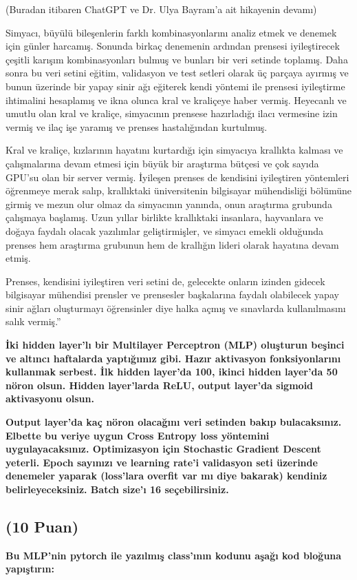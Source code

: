 \documentclass[11pt]{article}
\begin{document}
(Buradan itibaren ChatGPT ve Dr. Ulya Bayram'a ait hikayenin devamı)

Simyacı, büyülü bileşenlerin farklı kombinasyonlarını analiz etmek ve denemek için günler harcamış. Sonunda birkaç denemenin ardından prensesi iyileştirecek çeşitli karışım kombinasyonları bulmuş ve bunları bir veri setinde toplamış. Daha sonra bu veri setini eğitim, validasyon ve test setleri olarak üç parçaya ayırmış ve bunun üzerinde bir yapay sinir ağı eğiterek kendi yöntemi ile prensesi iyileştirme ihtimalini hesaplamış ve ikna olunca kral ve kraliçeye haber vermiş. Heyecanlı ve umutlu olan kral ve kraliçe, simyacının prensese hazırladığı ilacı vermesine izin vermiş ve ilaç işe yaramış ve prenses hastalığından kurtulmuş.

Kral ve kraliçe, kızlarının hayatını kurtardığı için simyacıya krallıkta kalması ve çalışmalarına devam etmesi için büyük bir araştırma bütçesi ve çok sayıda GPU'su olan bir server vermiş. İyileşen prenses de kendisini iyileştiren yöntemleri öğrenmeye merak salıp, krallıktaki üniversitenin bilgisayar mühendisliği bölümüne girmiş ve mezun olur olmaz da simyacının yanında, onun araştırma grubunda çalışmaya başlamış. Uzun yıllar birlikte krallıktaki insanlara, hayvanlara ve doğaya faydalı olacak yazılımlar geliştirmişler, ve simyacı emekli olduğunda prenses hem araştırma grubunun hem de krallığın lideri olarak hayatına devam etmiş.

Prenses, kendisini iyileştiren veri setini de, gelecekte onların izinden gidecek bilgisayar mühendisi prensler ve prensesler başkalarına faydalı olabilecek yapay sinir ağları oluşturmayı öğrensinler diye halka açmış ve sınavlarda kullanılmasını salık vermiş.''

\textbf{İki hidden layer'lı bir Multilayer Perceptron (MLP) oluşturun beşinci ve altıncı haftalarda yaptığımız gibi. Hazır aktivasyon fonksiyonlarını kullanmak serbest. İlk hidden layer'da 100, ikinci hidden layer'da 50 nöron olsun. Hidden layer'larda ReLU, output layer'da sigmoid aktivasyonu olsun.}

\textbf{Output layer'da kaç nöron olacağını veri setinden bakıp bulacaksınız. Elbette bu veriye uygun Cross Entropy loss yöntemini uygulayacaksınız. Optimizasyon için Stochastic Gradient Descent yeterli. Epoch sayınızı ve learning rate'i validasyon seti üzerinde denemeler yaparak (loss'lara overfit var mı diye bakarak) kendiniz belirleyeceksiniz. Batch size'ı 16 seçebilirsiniz.}

\clearpage %
\subsection{(10 Puan)} \textbf{Bu MLP'nin pytorch ile yazılmış class'ının kodunu aşağı kod bloğuna yapıştırın:}
\end{document}
